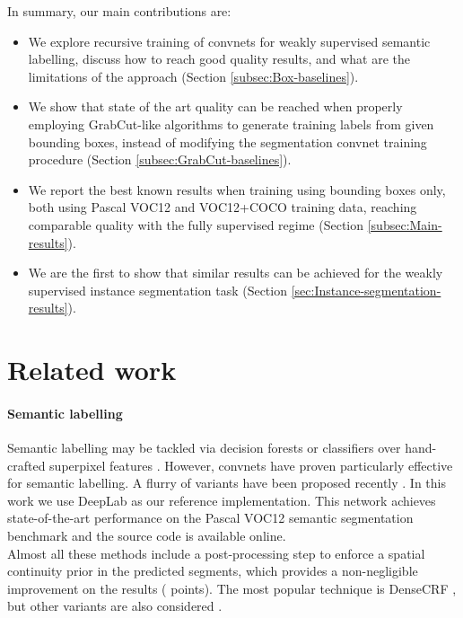 \documentclass[10pt,english,british,twocolumn]{article}
\begin{document}
In summary, our main contributions are:
\begin{itemize}[label=,itemsep=0em]
\item We explore recursive training of convnets for weakly supervised semantic
labelling, discuss how to reach good quality results, and what are
the limitations of the approach (Section \ref{subsec:Box-baselines}).
\item We show that state of the art quality can be reached when properly
employing GrabCut-like algorithms to generate training labels from
given bounding boxes, instead of modifying the segmentation convnet
training procedure (Section \ref{subsec:GrabCut-baselines}).
\item We report the best known results when training using bounding boxes
only, both using Pascal VOC12 and VOC12+COCO training data, reaching
comparable quality with the fully supervised regime (Section \ref{subsec:Main-results}).
\item We are the first to show that similar results can be achieved for
the weakly supervised instance segmentation task (Section \ref{sec:Instance-segmentation-results}).
\end{itemize}

\section{\label{subsec:Related-work}Related work}

\paragraph{Semantic labelling}

Semantic labelling may be tackled via decision forests \cite{Shotton2009Ijcv}
or classifiers over hand-crafted superpixel features \cite{Gould2009Iccv}.
However, convnets have proven particularly effective for semantic
labelling. A flurry of variants have been proposed recently \cite{Pinheiro2014Icml,Long2015Cvpr,Chen2015Iclr,Lin2016CvprAdelaide,Zheng2015IccvCrfAsRnn,Kokkinos2016Iclr,Yu2016Iclr}.
In this work we use Deep\-Lab \cite{Chen2015Iclr} as our reference
implementation. This network achieves state-of-the-art performance
on the Pascal VOC12 semantic segmentation benchmark and the source
code is available online. \\
Almost all these methods include a post-processing step to enforce
a spatial continuity prior in the predicted segments, which provides
a non-negligible improvement on the results ( points).
The most popular technique is DenseCRF \cite{Kraehenbuehl2011Nips},
but other variants are also considered \cite{Kolmogorov2004Pami,Barron2015ArXiv}.
\vspace{-1em}
\end{document}

